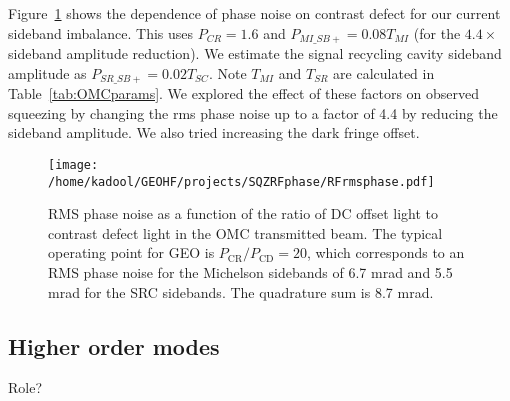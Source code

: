 \documentclass{ligodoc}
\begin{document}
Figure~\ref{fig:phirms} shows the dependence of phase noise on
contrast defect for our current sideband imbalance. This uses
$P_{CR}=1.6$ and $P_{MI\_SB+}=0.08 T_{MI}$ (for the $4.4\times$
sideband amplitude reduction). We estimate the signal recycling cavity
sideband amplitude as $P_{SR\_SB+}=0.02 T_{SC}$. Note $T_{MI}$ and
$T_{SR}$ are calculated in Table~\ref{tab:OMCparams}. We explored the
effect of these factors on observed squeezing by changing the rms
phase noise up to a factor of 4.4 by reducing the sideband
amplitude. We also tried increasing the dark fringe offset. 


\begin{figure}
\begin{centering}
\texttt{[image: /home/kadool/GEOHF/projects/SQZRFphase/RFrmsphase.pdf]}
\caption{RMS phase noise as a function of the ratio of DC offset light
  to contrast defect light in the OMC transmitted beam. The typical
  operating point for GEO is $P_{\mathrm{CR}}/P_{\mathrm{CD}}=20$,
  which corresponds to an RMS phase noise for the Michelson sidebands
  of 6.7 mrad and 5.5 mrad for the SRC sidebands. The quadrature sum
  is 8.7 mrad.}
\label{fig:phirms}
\end{centering}
\end{figure}



\subsection{Higher order modes}
Role?




\end{document}
